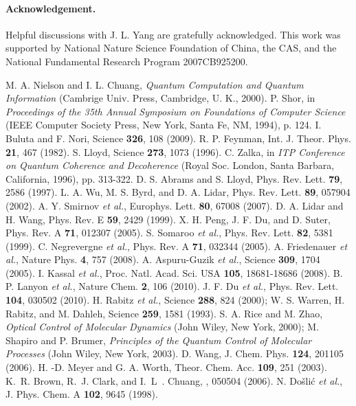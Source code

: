 \documentclass[prl,twocolumn,showpacs]{revtex4}
\begin{document}
\paragraph*{Acknowledgement.}

Helpful discussions with J. L. Yang are gratefully acknowledged.
This work was supported by National Nature Science Foundation of China, the CAS, and the National Fundamental Research Program 2007CB925200.

\begin{thebibliography}{99}
 M. A. Nielson and I. L. Chuang, {\it Quantum Computation and Quantum Information} (Cambrige Univ. Press, Cambridge, U. K., 2000).
 P. Shor, in {\it Proceedings of the 35th Annual Symposium on Foundations of Computer Science} (IEEE Computer Society Press, New York, Santa Fe, NM, 1994), p. 124.
 I. Buluta and F. Nori, Science \textbf{326}, 108 (2009).
 R. P. Feynman, Int. J. Theor. Phys. \textbf{21}, 467 (1982).
 S. Lloyd, Science \textbf{273}, 1073 (1996).
 C. Zalka, in {\it ITP Conference on Quantum Coherence and
Decoherence} (Royal Soc. London, Santa Barbara, California, 1996), pp. 313-322.
 D. S. Abrams and S. Lloyd, Phys. Rev. Lett. \textbf{79}, 2586
(1997).
 L. A. Wu, M. S. Byrd, and D. A. Lidar, Phys. Rev. Lett. \textbf{89},
057904 (2002).
 A. Y. Smirnov \emph{et al.},
Europhys. Lett. \textbf{80}, 67008 (2007).
 D. A. Lidar and H. Wang, Phys. Rev. E \textbf{59}, 2429 (1999).
 X. H. Peng, J. F. Du, and D. Suter, Phys. Rev. A \textbf{71},
012307 (2005).
 S. Somaroo \emph{et al.}, Phys. Rev. Lett. \textbf{82}, 5381 (1999).
 C. Negrevergne \emph{et al.}, Phys. Rev. A \textbf{71}, 032344 (2005).
 A. Friedenauer \emph{et al.}, Nature Phys. \textbf{4}, 757 (2008).
 A. Aspuru-Guzik \emph{et al.}, Science \textbf{309}, 1704 (2005).
 I. Kassal \emph{et al.}, Proc. Natl. Acad. Sci. USA \textbf{105}, 18681-18686 (2008).
 B. P. Lanyon \emph{et al.}, Nature Chem. \textbf{2}, 106 (2010).
 J. F. Du \emph{et al.}, Phys. Rev. Lett. \textbf{104}, 030502 (2010).
 H. Rabitz \emph{et al.}, Science \textbf{288}, 824 (2000);
W. S. Warren, H. Rabitz, and M. Dahleh, Science \textbf{ 259}, 1581 (1993).
 S. A. Rice and M. Zhao, {\it Optical Control of Molecular Dynamics}
(John Wiley, New York, 2000); M. Shapiro and P. Brumer, {\it Principles of the Quantum
Control of Molecular Processes} (John Wiley, New York, 2003).
 D. Wang, J. Chem. Phys. \textbf{124}, 201105 (2006).
 H. -D. Meyer and G. A. Worth,
Theor. Chem. Acc. \textbf{109}, 251 (2003).
K.~R. Brown, R.~J. Clark, and I.~L~. Chuang, , 050504 (2006).
N. {Do\v{s}li\'{c}} \emph{et al.}, J. Phys. Chem. A \textbf{102}, 9645 (1998).


\end{thebibliography}
\end{document}
